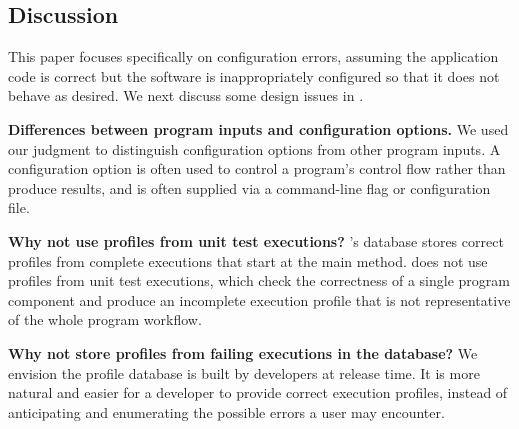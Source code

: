 \subsection{Discussion}

This paper focuses specifically on configuration errors,
assuming the application code is correct but the software		
is inappropriately configured so that it does not		
behave as desired. We next discuss some design issues in \ourtool.

\vspace{0.5mm}
\noindent \textbf{Differences between program inputs and configuration options.}
We used our judgment to distinguish configuration options 
from other program inputs. A configuration option is
often used to control a program's control flow rather
than produce results, and is often supplied via a command-line
flag or configuration file.



\vspace{0.5mm}
\noindent \textbf{Why not use profiles from unit test executions?}
\ourtool's database stores correct profiles from complete 
executions that start at the main method.
\ourtool does not use profiles from unit test executions, which check the
correctness
of a single program component and produce
an incomplete execution profile that is not representative of
the whole program workflow. 



\vspace{0.5mm}
\noindent \textbf{Why not store profiles from failing executions in the database?}
We envision the profile database is built by developers at release time.
It is more natural and easier for a developer to provide correct execution
profiles, instead of anticipating and enumerating the possible
errors a user may encounter.

